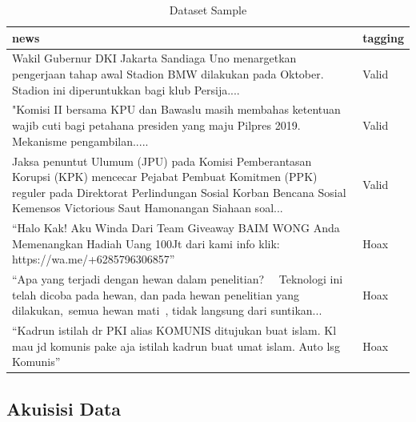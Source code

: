 \begin{table}[h]
    \caption{Dataset Sample}
    \label{tab:contoh_dataset}
    \centering
    \begin{tabular}{ | p{.8\linewidth} | l | }
        \hline
        \textbf{news}                                                                                                                                                                                                                     & \textbf{tagging} \\ \hline
        Wakil Gubernur DKI Jakarta Sandiaga Uno menargetkan pengerjaan tahap awal Stadion BMW dilakukan pada Oktober. Stadion ini diperuntukkan bagi klub Persija....                                                                     & Valid            \\ \hline
        "Komisi II bersama KPU dan Bawaslu masih membahas ketentuan wajib cuti bagi petahana presiden yang maju Pilpres 2019. Mekanisme pengambilan.....                                                                                  & Valid            \\ \hline
        Jaksa penuntut Ulumum (JPU) pada Komisi Pemberantasan Korupsi (KPK) mencecar Pejabat Pembuat Komitmen (PPK) reguler pada Direktorat Perlindungan Sosial Korban Bencana Sosial Kemensos Victorious Saut Hamonangan Siahaan soal... & Valid            \\ \hline
        “Halo Kak! Aku Winda Dari Team Giveaway BAIM WONG Anda Memenangkan Hadiah Uang 100Jt dari kami info klik: https://wa.me/+6285796306857”                                                                                           & Hoax             \\ \hline
        “Apa yang terjadi dengan hewan dalam penelitian?   Teknologi ini telah dicoba pada hewan, dan pada hewan penelitian yang dilakukan, semua hewan mati , tidak langsung dari suntikan...                                            & Hoax             \\ \hline
        “Kadrun istilah dr PKI alias KOMUNIS ditujukan buat islam. Kl mau jd komunis pake aja istilah kadrun buat umat islam. Auto lsg Komunis”                                                                                           & Hoax             \\ \hline
    \end{tabular}
\end{table}

\subsection{Akuisisi Data}

